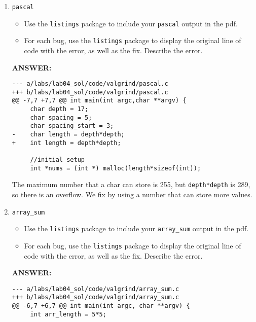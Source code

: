 \begin{enumerate}
    \newpage
    \item \texttt{pascal}
    \begin{itemize}
        \item Use the \texttt{listings} package to include your \texttt{pascal} output in the pdf.
        \item For each bug, use the \texttt{listings} package to display the original line of code with the error, as well as the fix.  Describe the error.
    \end{itemize}
    \textbf{ANSWER:} %

    \begin{tiny}
    
    \end{tiny}
    
\begin{lstlisting}[frame=single]
--- a/labs/lab04_sol/code/valgrind/pascal.c
+++ b/labs/lab04_sol/code/valgrind/pascal.c
@@ -7,7 +7,7 @@ int main(int argc,char **argv) {
     char depth = 17;
     char spacing = 5;
     char spacing_start = 3;
-    char length = depth*depth;
+    int length = depth*depth;
     
     //initial setup
     int *nums = (int *) malloc(length*sizeof(int));

\end{lstlisting}

The maximum number that a char can store is 255, but \texttt{depth*depth} is 289, so there is an overflow.  We fix by using a number that can store more values.

    \newpage
    \item \texttt{array\_sum}
    \begin{itemize}
        \item Use the \texttt{listings} package to include your \texttt{array\_sum} output in the pdf.
        \item For each bug, use the \texttt{listings} package to display the original line of code with the error, as well as the fix.  Describe the error.
    \end{itemize}
    \textbf{ANSWER:} %

    

    
\begin{lstlisting}[frame=single]
--- a/labs/lab04_sol/code/valgrind/array_sum.c
+++ b/labs/lab04_sol/code/valgrind/array_sum.c
@@ -6,7 +6,7 @@ int main(int argc, char **argv) {
     int arr_length = 5*5;
 

\end{lstlisting}
\end{enumerate}
